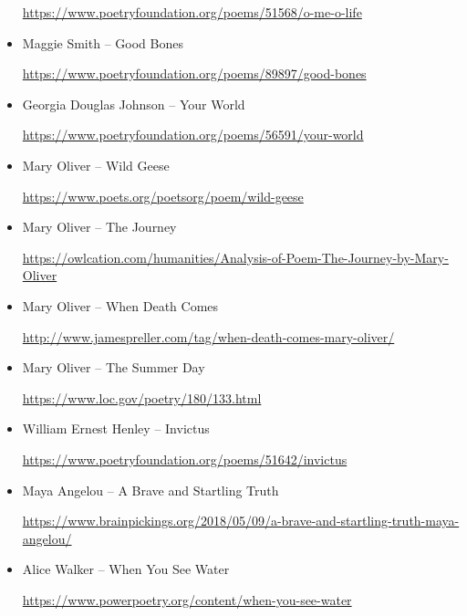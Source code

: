 \documentclass[12pt, openany, letterpaper]{memoir}
\begin{document}
\begin{itemize}
	\hyperref[https://www.poetryfoundation.org/poems/51568/o-me-o-life]{https://www.poetryfoundation.org/poems/51568/o-me-o-life}
	
	\item Maggie Smith -- Good Bones
	
	\hyperref[https://www.poetryfoundation.org/poems/89897/good-bones]{https://www.poetryfoundation.org/poems/89897/good-bones}
	
	\item Georgia Douglas Johnson -- Your World
	
	\hyperref[https://www.poetryfoundation.org/poems/56591/your-world]{https://www.poetryfoundation.org/poems/56591/your-world}
	
	\item Mary Oliver -- Wild Geese
	
	\hyperref[https://www.poets.org/poetsorg/poem/wild-geese]{https://www.poets.org/poetsorg/poem/wild-geese}
	
	\item Mary Oliver -- The Journey
	
	\hyperref[https://owlcation.com/humanities/Analysis-of-Poem-The-Journey-by-Mary-Oliver]{https://owlcation.com/humanities/Analysis-of-Poem-The-Journey-by-Mary-Oliver}
	
	\item Mary Oliver -- When Death Comes
	
	\hyperref[http://www.jamespreller.com/tag/when-death-comes-mary-oliver/]{http://www.jamespreller.com/tag/when-death-comes-mary-oliver/}
	
	\item Mary Oliver -- The Summer Day
	
	\hyperref[https://www.loc.gov/poetry/180/133.html]{https://www.loc.gov/poetry/180/133.html}
	
	\item William Ernest Henley -- Invictus
	
	\hyperref[https://www.poetryfoundation.org/poems/51642/invictus]{https://www.poetryfoundation.org/poems/51642/invictus}
	
	\item Maya Angelou -- A Brave and Startling Truth
	
	\hyperref[https://www.brainpickings.org/2018/05/09/a-brave-and-startling-truth-maya-angelou/]{https://www.brainpickings.org/2018/05/09/a-brave-and-startling-truth-maya-angelou/}
	
	\item Alice Walker -- When You See Water
	
	\hyperref[https://www.powerpoetry.org/content/when-you-see-water]{https://www.powerpoetry.org/content/when-you-see-water}
\end{itemize}
\end{document}

